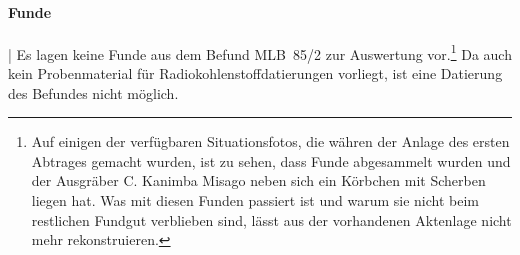 \paragraph{Funde}\hspace{-.5em}|\hspace{.5em}%
Es lagen keine Funde aus dem Befund MLB~85/2 zur Auswertung vor.\footnote{Auf einigen der verfügbaren Situationsfotos, die währen der Anlage des ersten Abtrages gemacht wurden, ist zu sehen, dass Funde abgesammelt wurden und der Ausgräber C. Kanimba Misago neben sich ein Körbchen mit Scherben liegen hat. Was mit diesen Funden passiert ist und warum sie nicht beim restlichen Fundgut verblieben sind, lässt aus der vorhandenen Aktenlage nicht mehr rekonstruieren.} Da auch kein Probenmaterial für Radiokohlenstoffdatierungen vorliegt, ist eine Datierung des Befundes nicht möglich.